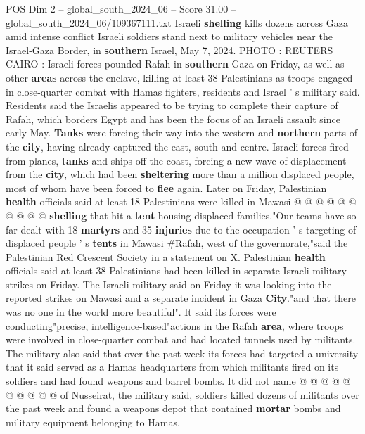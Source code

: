 \begin{textsample}{POS Dim 2 – global\_south\_2024\_06 – Score 31.00 – global\_south\_2024\_06/109367111.txt}  \label{ex:f2_pos_053}
Israeli \textbf{shelling} kills dozens across Gaza amid intense conflict Israeli soldiers stand next to military vehicles near the Israel-Gaza Border, in \textbf{southern} Israel, May 7, 2024.
PHOTO : REUTERS CAIRO : Israeli forces pounded Rafah in \textbf{southern} Gaza on Friday, as well as other \textbf{areas} across the enclave, killing at least 38 Palestinians as troops engaged in close-quarter combat with Hamas fighters, residents and Israel ' s military said.
Residents said the Israelis appeared to be trying to complete their capture of Rafah, which borders Egypt and has been the focus of an Israeli assault since early May. \textbf{Tanks} were forcing their way into the western and \textbf{northern} parts of the \textbf{city}, having already captured the east, south and centre.
Israeli forces fired from planes, \textbf{tanks} and ships off the coast, forcing a new wave of displacement from the \textbf{city}, which had been \textbf{sheltering} more than a million displaced people, most of whom have been forced to \textbf{flee} again.
Later on Friday, Palestinian \textbf{health} officials said at least 18 Palestinians were killed in Mawasi @ @ @ @ @ @ @ @ @ @ \textbf{shelling} that hit a \textbf{tent} housing displaced families."Our teams have so far dealt with 18 \textbf{martyrs} and 35 \textbf{injuries} due to the occupation ' s targeting of displaced people ' s \textbf{tents} in Mawasi \#Rafah, west of the governorate,"said the Palestinian Red Crescent Society in a statement on X.
Palestinian \textbf{health} officials said at least 38 Palestinians had been killed in separate Israeli military strikes on Friday.
The Israeli military said on Friday it was looking into the reported strikes on Mawasi and a separate incident in Gaza \textbf{City}."and that there was no one in the world more beautiful".
It said its forces were conducting"precise, intelligence-based"actions in the Rafah \textbf{area}, where troops were involved in close-quarter combat and had located tunnels used by militants.
The military also said that over the past week its forces had targeted a university that it said served as a Hamas headquarters from which militants fired on its soldiers and had found weapons and barrel bombs.
It did not name @ @ @ @ @ @ @ @ @ @ of Nusseirat, the military said, soldiers killed dozens of militants over the past week and found a weapons depot that contained \textbf{mortar} bombs and military equipment belonging to Hamas.

\end{textsample}
